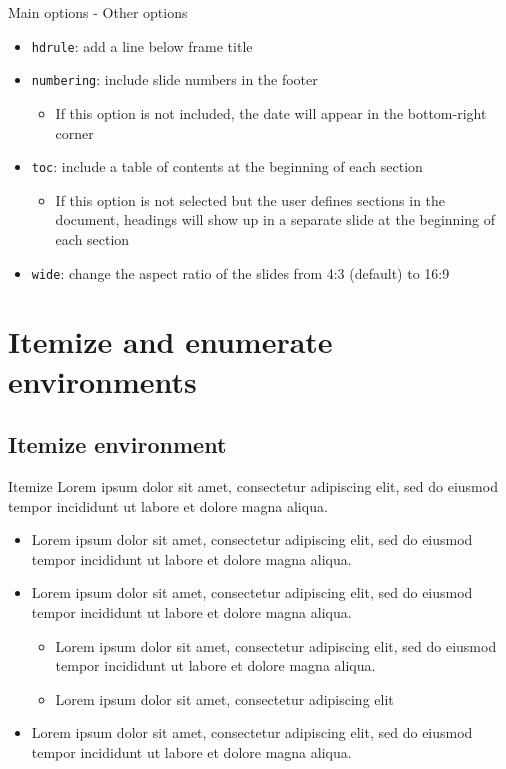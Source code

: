 \documentclass[10pt,numbering,toc,wide]{bpslides}
\begin{document}
\begin{frame}{Main options - Other options}\label{firstslide}
\begin{itemize}
\item \texttt{hdrule}: add a line below frame title
\item \texttt{numbering}: include slide numbers in the footer
\begin{itemize}
\item If this option is not included, the date will appear in the bottom-right corner
\end{itemize}
\item \texttt{toc}: include a table of contents at the beginning of each section
\begin{itemize}
\item If this option is not selected but the user defines sections in the document, headings will show up in a separate slide at the beginning of each section
\end{itemize}
\item \texttt{wide}: change the aspect ratio of the slides from 4:3 (default) to 16:9
\end{itemize}
\end{frame}

\section{Itemize and enumerate environments}

\subsection{Itemize environment}

\begin{frame}{Itemize}\label{firstslide}
Lorem ipsum dolor sit amet, consectetur adipiscing elit, sed do eiusmod tempor incididunt ut labore et dolore magna aliqua. 
\begin{itemize}
\item Lorem ipsum dolor sit amet, consectetur adipiscing elit, sed do eiusmod tempor incididunt ut labore et dolore magna aliqua.
\item Lorem ipsum dolor sit amet, consectetur adipiscing elit, sed do eiusmod tempor incididunt ut labore et dolore magna aliqua.
\begin{itemize}
\item Lorem ipsum dolor sit amet, consectetur adipiscing elit, sed do eiusmod tempor incididunt ut labore et dolore magna aliqua.
\item Lorem ipsum dolor sit amet, consectetur adipiscing elit
\end{itemize}
\item Lorem ipsum dolor sit amet, consectetur adipiscing elit, sed do eiusmod tempor incididunt ut labore et dolore magna aliqua.
\end{itemize}
\end{frame}
\end{document}
